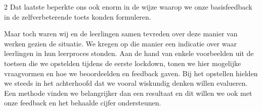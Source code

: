 \begin{multicols}{2}
Dat laatste beperkte ons ook enorm in de wijze waarop we onze basisfeedback in de zelfverbeterende toets konden formuleren.

Maar toch waren wij en de leerlingen samen tevreden over deze manier van werken gezien de situatie. We kregen op die manier een indicatie over waar leerlingen in hun leerproces stonden. Aan de hand van enkele voorbeelden uit de toetsen die we opstelden tijdens de eerste lockdown, tonen we hier mogelijke vraagvormen en hoe we beoordeelden en feedback gaven. Bij het opstellen hielden we steeds in het achterhoofd dat we vooral wiskundig denken willen evalueren. Een methode vinden we belangrijker dan een resultaat en dit willen we ook met onze feedback en het behaalde cijfer ondersteunen.

\end{multicols}

